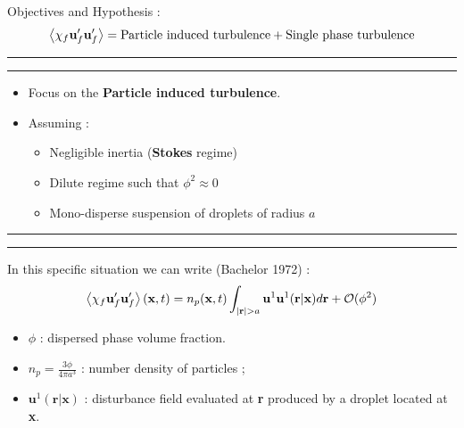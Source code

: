 \documentclass{sintefbeamer}
\begin{document}
\begin{frame}{Objectives and Hypothesis :}
  \begin{equation*}
     \left<\chi_f \textbf{u}_f'\textbf{u}_f'\right>
     = 
     \text{Particle induced turbulence}
     + \text{Single phase turbulence}
  \end{equation*}
  \hrule\hrule
  \pause
  \begin{itemize}
    \item 
    Focus on the \textbf{Particle induced turbulence}. 
    \item Assuming : 
    \begin{itemize}
      \item Negligible inertia (\textbf{Stokes} regime)
      \item Dilute regime such that $\phi^{2} \approx 0$ 
      \item Mono-disperse suspension of droplets of radius $a$
    \end{itemize}
  \end{itemize}
\hrule\hrule
  \pause
  In this specific situation we can write  (Bachelor 1972) :
  \begin{equation*}
    \left<\chi_f \textbf{u}'_f\textbf{u}'_f\right>(\textbf{x},t)
    = 
    n_p(\textbf{x},t)
    \int_{|\textbf{r}| > a }
     \textbf{u}^1\textbf{u}^1(\textbf{r}|\textbf{x}) d\textbf{r}
    +\mathcal{O}(\phi^2)
\end{equation*}

\begin{itemize}
  \item $\phi$ : dispersed phase volume fraction.
  \item $n_p = \frac{3\phi}{4\pi a^3}$ : number density of particles ;
  \item $\textbf{u}^1(\textbf{r}|\textbf{x})$ : disturbance field evaluated at \textbf{r} produced by a droplet located at \textbf{x}. 
\end{itemize}
\end{frame}
\end{document}
